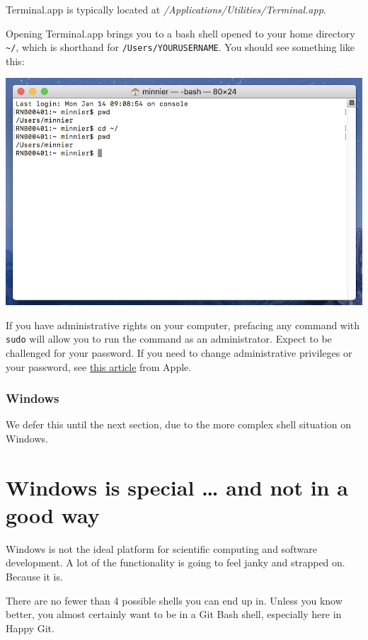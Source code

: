 \documentclass[
]{book}
\begin{document}
Terminal.app is typically located at \emph{/Applications/Utilities/Terminal.app}.

Opening Terminal.app brings you to a bash shell opened to your home directory \texttt{\textasciitilde{}/}, which is shorthand for \texttt{/Users/YOURUSERNAME}. You should see something like this:

\includegraphics{img/terminal_mac.png}

If you have administrative rights on your computer, prefacing any command with \texttt{sudo} will allow you to run the command as an administrator. Expect to be challenged for your password. If you need to change administrative privileges or your password, see \href{https://support.apple.com/en-us/HT204012}{this article} from Apple.

\subsubsection{Windows}\label{windows-1}

We defer this until the next section, due to the more complex shell situation on Windows.

\section{Windows is special \ldots{} and not in a good way}\label{windows-shell-hell}

Windows is not the ideal platform for scientific computing and software development. A lot of the functionality is going to feel janky and strapped on. Because it is.

There are no fewer than 4 possible shells you can end up in. Unless you know better, you almost certainly want to be in a Git Bash shell, especially here in Happy Git.
\end{document}
